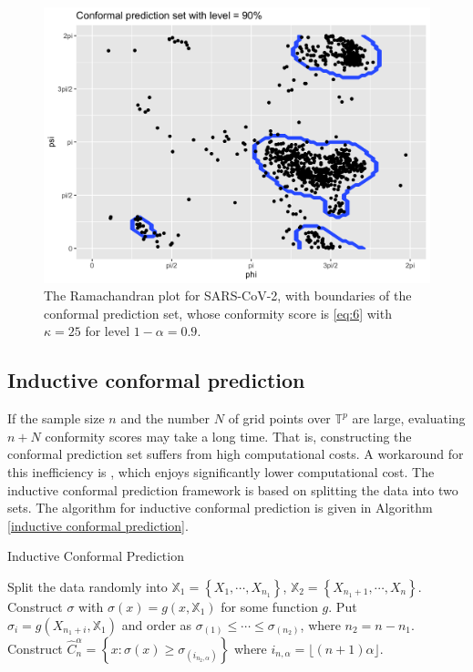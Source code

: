  \begin{figure}
     \centering
     \includegraphics[scale = 0.15]{cpkde.png}
     \caption{The Ramachandran plot for SARS-CoV-2, with boundaries of the conformal prediction set,  whose conformity score is \eqref{eq:6} with $\kappa = 25$ for level $1-\alpha = 0.9$. }
     \label{fig:cpkde}
 \end{figure}

\subsection{Inductive conformal prediction}
If the sample size $n$ and the number $N$ of grid points over $\mathbb{T}^p$ are large, evaluating $n + N$ conformity scores may take a long time. That is, constructing the conformal prediction set suffers from high computational costs. A workaround for this inefficiency is , which enjoys significantly lower computational cost. The inductive conformal prediction framework is based on splitting the data into two sets. The algorithm for inductive conformal prediction is given in Algorithm \ref{inductive conformal prediction}.

\begin{algorithm}
\caption{Inductive Conformal Prediction}\label{inductive conformal prediction}
\begin{algorithmic}[1]
  \State Split the data randomly into  $\mathbb{X}_1=\left\{X_1,\cdots, X_{n_1}\right\}$, $\mathbb{X}_2=\left\{X_{n_1+1},\cdots, X_{n}\right\}$.
  \State Construct $\sigma$ with $\sigma\left(x\right) = g\left(x,\mathbb{X}_1\right)$ for some function $g$.
  \State Put $\sigma_i = g\left(X_{n_1+i},\mathbb{X}_1\right)$ and order as $\sigma_{\left(1\right)}\le\cdots\le\sigma_{\left(n_2\right)}$, where $n_2=n-n_1$.
  \State Construct $\hat{C}^{\alpha}_n = \left\{x:\sigma(x)\ge\sigma_{\left(i_{n_2,\alpha}\right)}\right\}$ where $i_{n,\alpha} = \lfloor\left(n+1\right)\alpha\rfloor$.
\EndProcedure
\end{algorithmic}
\end{algorithm}

